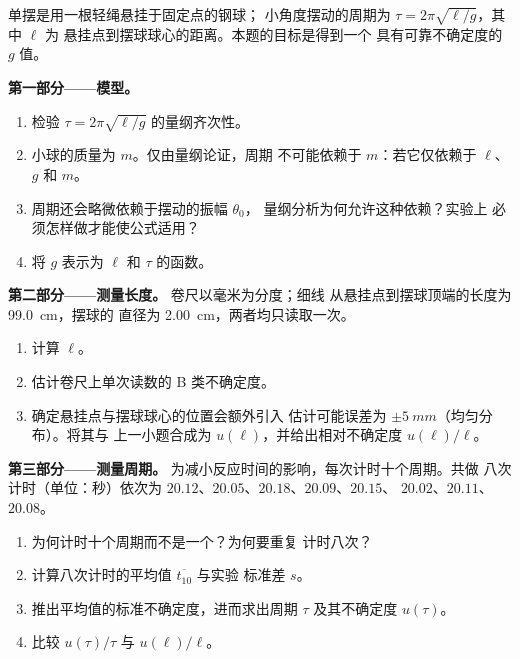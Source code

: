 \begin{problem}
\label{pb:b1:units-dimensions:1}
单摆是用一根轻绳悬挂于固定点的钢球；
小角度摆动的周期为 $\tau = 2\pi\sqrt{\ell/g}$，其中 $\ell$ 为
悬挂点到摆球球心的距离。本题的目标是得到一个
具有可靠不确定度的 $g$ 值。

\medskip
\noindent\textbf{第一部分——模型。}
\begin{enumerate}
  \item 检验 $\tau = 2\pi\sqrt{\ell/g}$ 的量纲齐次性。
  \item 小球的质量为 $m$。仅由量纲论证，周期
        不可能依赖于 $m$：若它仅依赖于 $\ell$、$g$
        和 $m$。
  \item 周期还会略微依赖于摆动的振幅 $\theta_0$，
        量纲分析为何允许这种依赖？实验上
        必须怎样做才能使公式适用？
  \item 将 $g$ 表示为 $\ell$ 和 $\tau$ 的函数。
\end{enumerate}

\medskip
\noindent\textbf{第二部分——测量长度。}
卷尺以毫米为分度；细线
从悬挂点到摆球顶端的长度为 \qty{99.0}{cm}，摆球的
直径为 \qty{2.00}{cm}，两者均只读取一次。
\begin{enumerate}[resume]
  \item 计算 $\ell$。
  \item 估计卷尺上单次读数的
        B 类不确定度。
  \item 确定悬挂点与摆球球心的位置会额外引入
        估计可能误差为 $\pm\qty{5}{mm}$（均匀分布）。将其与
        上一小题合成为 $u(\ell)$，并给出相对不确定度
        $u(\ell)/\ell$。
\end{enumerate}

\medskip
\noindent\textbf{第三部分——测量周期。}
为减小反应时间的影响，每次计时十个周期。共做
八次计时（单位：秒）依次为 $20.12$、$20.05$、$20.18$、$20.09$、$20.15$、
$20.02$、$20.11$、$20.08$。
\begin{enumerate}[resume]
  \item 为何计时十个周期而不是一个？为何要重复
        计时八次？
  \item 计算八次计时的平均值 $\overline{t_{10}}$ 与实验
        标准差 $s$。
  \item 推出平均值的标准不确定度，进而求出周期
        $\tau$ 及其不确定度 $u(\tau)$。
  \item 比较 $u(\tau)/\tau$ 与 $u(\ell)/\ell$。
\end{enumerate}


\end{problem}
